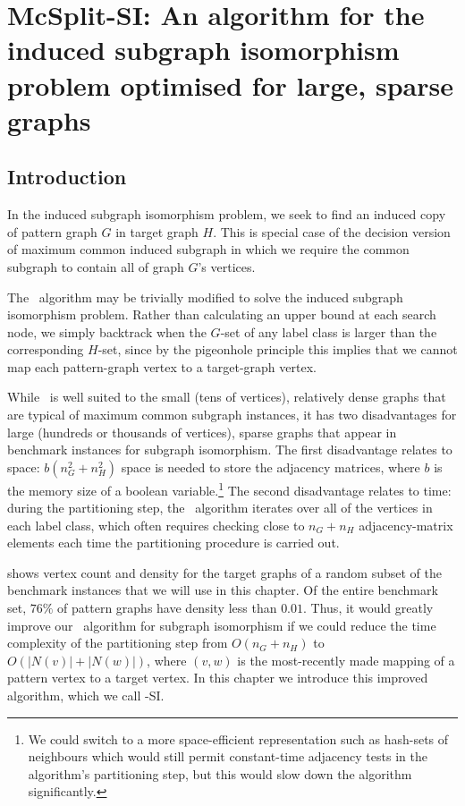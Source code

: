 
\chapter{McSplit-SI: An algorithm for the induced subgraph isomorphism problem
optimised for large, sparse graphs}
\label{c:mcsplit-si}

\section{Introduction}

In the induced subgraph isomorphism problem, we seek to find an induced copy of pattern graph $G$ in target graph $H$. This is special case of the decision version of maximum common induced subgraph in which we require the common subgraph to contain all of graph $G$'s vertices.

The \McSplit\ algorithm may be trivially modified to solve the induced subgraph isomorphism problem. Rather than calculating an upper bound at each search node, we simply backtrack when the $G$-set of any label class is larger than the corresponding $H$-set, since by the pigeonhole principle this implies that we cannot map each pattern-graph vertex to a target-graph vertex.

While \McSplit\ is well suited to the small (tens of vertices), relatively dense graphs that are typical of maximum common subgraph instances, it has two disadvantages for large (hundreds or thousands of vertices), sparse graphs that appear in benchmark instances for subgraph isomorphism.  The first disadvantage relates to space: $b(n_G^2 + n_H^2)$ space is needed to store the adjacency matrices, where $b$ is the memory size of a boolean variable.\footnote{We could switch to a more space-efficient representation such as hash-sets of neighbours which would still permit constant-time adjacency tests in the algorithm's partitioning step, but this would slow down the algorithm significantly.}  The second disadvantage relates to time: during the partitioning step, the \McSplit\ algorithm iterates over all of the vertices in each label class, which often requires checking close to $n_G + n_H$ adjacency-matrix elements each time the partitioning procedure is carried out.

 shows vertex count and density for the target graphs of a random subset of the benchmark instances
that we will use in this chapter.  Of the entire benchmark set, $76\%$ of pattern graphs have density less than $0.01$.  Thus, it would
greatly improve our \McSplit\ algorithm for subgraph isomorphism if we could reduce the time complexity of the partitioning
step from $O(n_G + n_H)$ to $O(|N(v)| + |N(w)|)$, where $(v,w)$ is the most-recently made mapping of a pattern vertex to a target
vertex.  In this chapter we introduce this improved algorithm, which we call \McSplit-SI.

